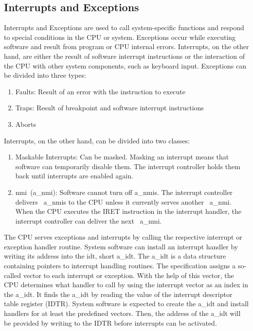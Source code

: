 \subsection{Interrupts and Exceptions}
\label{sec:state:technical:interrupts}
Interrupts and Exceptions are used to call system-specific functions and respond
to special conditions in the CPU or system. Exceptions occur while executing
software and result from program or CPU internal errors. Interrupts, on the
other hand, are either the result of software interrupt instructions or the
interaction of the CPU with other system components, such as keyboard input.
Exceptions can be divided into three types:
\begin{enumerate}
    \item Faults: Result of an error with the instruction to execute
    \item Traps: Result of breakpoint and software interrupt instructions
    \item Aborts
\end{enumerate}
Interrupts, on the other hand, can be divided into two classes:
\begin{enumerate}
    \item Maskable Interrupts: Can be masked. Masking an interrupt means that
          software can temporarily disable them. The interrupt controller holds
          them back until interrupts are enabled again.
    \item \Gls{nmi}~(\acrshort{a_nmi}): Software cannot turn off
          \acrshort{a_nmi}s. The interrupt controller delivers~
          \acrshort{a_nmi}s to the CPU unless it currently serves another~
          \acrshort{a_nmi}. When the CPU executes the IRET instruction in the
          interrupt handler, the interrupt controller can deliver the next~
          \acrshort{a_nmi}.
\end{enumerate}
The CPU serves exceptions and interrupts by calling the respective interrupt or
exception handler routine. System software can install an interrupt handler by
writing its address into the \gls{idt}, short \acrshort{a_idt}. The
\acrshort{a_idt} is a data structure containing pointers to interrupt handling
routines. The specification assigns a so-called vector to each interrupt or
exception. With the help of this vector, the CPU determines what handler to call
by using the interrupt vector as an index in the \acrshort{a_idt}. It finds the
\acrshort{a_idt} by reading the value of the interrupt descriptor table register
(IDTR). System software is expected to create the \acrshort{a_idt} and install
handlers for at least the predefined vectors. Then, the address of the
\acrshort{a_idt} will be provided by writing to the IDTR before interrupts can
be activated. \\

